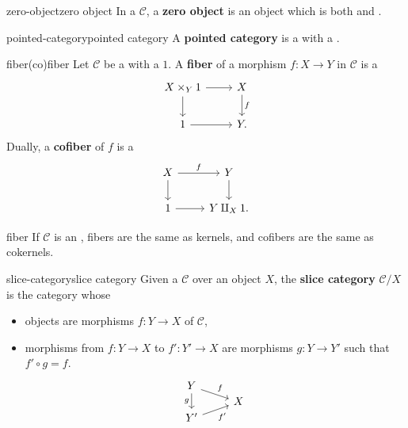 \begin{topic}{zero-object}{zero object}
    In a  $\mathcal{C}$, a \textbf{zero object} is an object which is both  and .
\end{topic}

\begin{topic}{pointed-category}{pointed category}
    A \textbf{pointed category} is a  with a .
\end{topic}

\begin{topic}{fiber}{(co)fiber}
    Let $\mathcal{C}$ be a  with a  $1$. A \textbf{fiber} of a morphism $f : X \to Y$ in $\mathcal{C}$ is a 
    \[ \begin{tikzcd}
        X \times_Y 1 \arrow{r} \arrow{d} & X \arrow{d}{f} \\ 1 \arrow{r} & Y .
    \end{tikzcd} \]
    Dually, a \textbf{cofiber} of $f$ is a 
    \[ \begin{tikzcd}
        X \arrow{r}{f} \arrow{d} & Y \arrow{d} \\ 1 \arrow{r} & Y \amalg_X 1 .
    \end{tikzcd} \]
\end{topic}

\begin{example}{fiber}
    If $\mathcal{C}$ is an , fibers are the same as kernels, and cofibers are the same as cokernels.
\end{example}

\begin{topic}{slice-category}{slice category}
    Given a  $\mathcal{C}$ over an object $X$, the \textbf{slice category} $\mathcal{C}/X$ is the category whose
    \begin{itemize}
        \item objects are morphisms $f : Y \to X$ of $\mathcal{C}$,
        \item morphisms from $f : Y \to X$ to $f' : Y' \to X$ are morphisms $g : Y \to Y'$ such that $f' \circ g = f$.
        \[ \begin{tikzcd}[row sep=0em] Y \arrow{rd}{f} \arrow[swap]{dd}{g} & \\ & X \\ Y' \arrow[swap]{ur}{f'} & \end{tikzcd} \]
    \end{itemize}
\end{topic}


